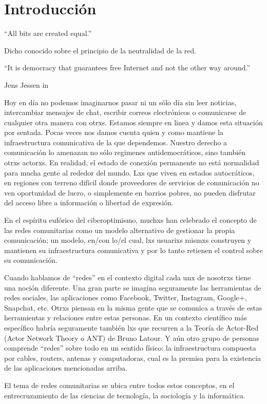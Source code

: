 \section{Introducción}

\epigraph{``All bits are created equal.''}{Dicho conocido sobre el principio de la neutralidad de la red.}
\epigraph{``It is democracy that guarantees free Internet and not the other way around.''}{Jens Jessen in~\autocite{Rieder2012}}

Hoy en día no podemos imaginarnos pasar ni un sólo día sin leer noticias, intercambiar mensajes de chat, escribir correos electrónicos o comunicarse de cualquier otra manera con otrxs.
Estamos siempre en linea y damos esta situación por sentada.
Pocas veces nos damos cuenta quien y como mantiene la infraestructura comunicativa de la que dependemos.
Nuestro derecho a comunicación lo amenazan no sólo regimenes antidemocráticos, sino también otrxs actorxs.
En realidad, el estado de conexión permanente no está normalidad para mucha gente al rededor del mundo.
Lxs que viven en estados autocráticos, en regiones con terreno difícil donde proveedores de servicios de comunicación no ven oportunidad de lucro, o simplemente en barrios pobres, no pueden disfrutar del acceso libre a información o libertad de expresión.

En el espíritu eufórico del ciberoptimismo, muchxs han celebrado el concepto de las redes comunitarias como un modelo alternativo de gestionar la propia comunicación;
un modelo, en/con lo/el cual, lxs usuarixs mismxs construyen y mantienen su infraestructura comunicativa y por lo tanto retienen el control sobre su comunicación.

Cuando hablamos de ``redes'' en el contexto digital cada unx de nosotrxs tiene una noción diferente.
Una gran parte se imagina seguramente las herramientas de redes sociales, las aplicaciones como Facebook, Twitter, Instagram, Google+, Snapchat, etc.
Otrxs piensan en la misma gente que se comunica a través de estas herramientas y relaciones entre estas personas.
En un contexto científico más específico habría seguramente también lxs que recurren a la Teoría de Actor-Red (Actor Network Theory o ANT) de Bruno Latour.
Y aún otro grupo de personas comprende ``redes'' sobre todo en un sentido físico: la infraestructura compuesta por cables, routers, antenas y computadoras, cual es la premisa para la existencia de las aplicaciones mencionadas arriba.

El tema de redes comunitarias se ubica entre todos estos conceptos, en el entrecruzamiento de las ciencias de tecnología, la sociología y la informática.

